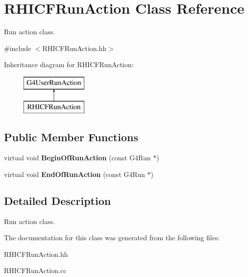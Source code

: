 \hypertarget{class_r_h_i_c_f_run_action}{}\section{R\+H\+I\+C\+F\+Run\+Action Class Reference}
\label{class_r_h_i_c_f_run_action}


Run action class.  




{\ttfamily \#include $<$R\+H\+I\+C\+F\+Run\+Action.\+hh$>$}

Inheritance diagram for R\+H\+I\+C\+F\+Run\+Action\+:\begin{figure}[H]
\begin{center}
\leavevmode
\includegraphics[height=2.000000cm]{class_r_h_i_c_f_run_action}
\end{center}
\end{figure}
\subsection*{Public Member Functions}
\begin{DoxyCompactItemize}
\item 
\hypertarget{class_r_h_i_c_f_run_action_a9c136cf2ae3718305e337f9f1d27bbd2}{}virtual void {\bfseries Begin\+Of\+Run\+Action} (const G4\+Run $\ast$)\label{class_r_h_i_c_f_run_action_a9c136cf2ae3718305e337f9f1d27bbd2}

\item 
\hypertarget{class_r_h_i_c_f_run_action_ab3f9bbac27bac8af0f8f4dfada553a30}{}virtual void {\bfseries End\+Of\+Run\+Action} (const G4\+Run $\ast$)\label{class_r_h_i_c_f_run_action_ab3f9bbac27bac8af0f8f4dfada553a30}

\end{DoxyCompactItemize}


\subsection{Detailed Description}
Run action class. 

The documentation for this class was generated from the following files\+:\begin{DoxyCompactItemize}
\item 
R\+H\+I\+C\+F\+Run\+Action.\+hh\item 
R\+H\+I\+C\+F\+Run\+Action.\+cc\end{DoxyCompactItemize}
